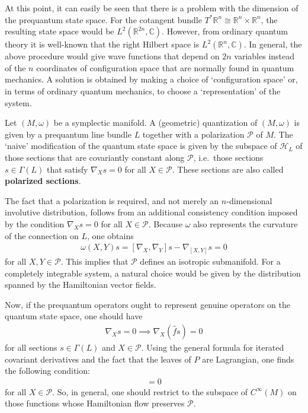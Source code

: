     At this point, it can easily be seen that there is a problem with the dimension of the prequantum state space. For the cotangent bundle $T^*\mathbb{R}^n\cong\mathbb{R}^n\times\mathbb{R}^n$, the resulting state space would be $L^2(\mathbb{R}^{2n},\mathbb{C})$. However, from ordinary quantum theory it is well-known that the right Hilbert space is $L^2(\mathbb{R}^n,\mathbb{C})$. In general, the above procedure would give wave functions that depend on $2n$ variables instead of the $n$ coordinates of configuration space that are normally found in quantum mechanics. A solution is obtained by making a choice of `configuration space' or, in terms of ordinary quantum mechanics, to choose a `representation' of the system.
    \begin{construct}
        Let $(M,\omega)$ be a symplectic manifold. A (geometric) quantization of $(M,\omega)$ is given by a prequantum line bundle $L$ together with a polarization $\mathcal{P}$ of $M$. The `naive' modification of the quantum state space is given by the subspace of $\mathcal{H}_L$ of those sections that are covariantly constant along $\mathcal{P}$, i.e.~those sections $s\in\Gamma(L)$ that satisfy $\nabla_Xs=0$ for all $X\in\mathcal{P}$. These sections are also called \textbf{polarized sections}.

        The fact that a polarization is required, and not merely an $n$-dimensional involutive distribution, follows from an additional consistency condition imposed by the condition $\nabla_Xs=0$ for all $X\in\mathcal{P}$. Because $\omega$ also represents the curvature of the connection on $L$, one obtains
        \begin{gather}
            \omega(X,Y)s = [\nabla_X,\nabla_Y]s - \nabla_{[X,Y]}s = 0
        \end{gather}
        for all $X,Y\in\mathcal{P}$. This implies that $\mathcal{P}$ defines an isotropic submanifold. For a completely integrable system, a natural choice would be given by the distribution spanned by the Hamiltonian vector fields.

        Now, if the prequantum operators ought to represent genuine operators on the quantum state space, one should have
        \begin{gather}
            \nabla_Xs=0\implies\nabla_X(\widehat{f}s)=0
        \end{gather}
        for all sections $s\in\Gamma(L)$ and $X\in\mathcal{P}$. Using the general formula for iterated covariant derivatives and the fact that the leaves of $P$ are Lagrangian, one finds the following condition:
        \begin{gather}
            [X,X_f]=0
        \end{gather}
        for all $X\in\mathcal{P}$. So, in general, one should restrict to the subspace of $C^\infty(M)$ on those functions whose Hamiltonian flow preserves $\mathcal{P}$.


\end{construct}
